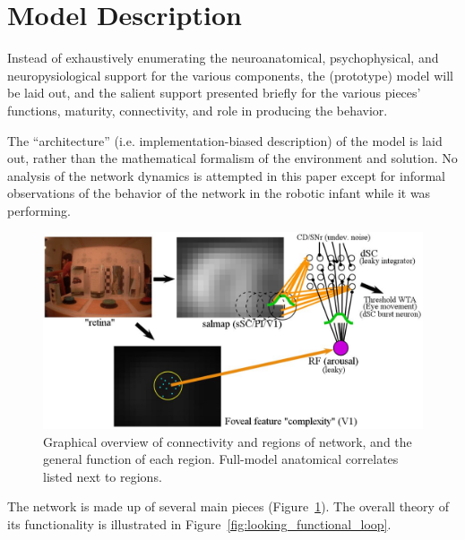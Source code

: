 \documentclass[conference]{IEEEtran}
\begin{document}
\section{Model Description}
Instead of exhaustively enumerating the neuroanatomical,
psychophysical, and neuropysiological support for the various
components, the (prototype) model will be laid out, and the salient
support presented briefly for the various pieces' functions, maturity,
connectivity, and role in producing the behavior.

The ``architecture'' (i.e. implementation-biased description) of the
model is laid out, rather than the mathematical formalism of the
environment and solution. No analysis of the network dynamics is
attempted in this paper except for informal observations of the
behavior of the network in the robotic infant while it was performing.

\begin{figure} [!t]
\centering
\includegraphics[width=15.0cm]{looking_prototype_model.jpg}
\caption{Graphical overview of connectivity and regions of network,
  and the general function of each region. Full-model anatomical
  correlates listed next to regions.}
\label{fig:looking_prototype_model}
\end{figure}

The network is made up of several main pieces
(Figure~\ref{fig:looking_prototype_model}). The overall theory of its
functionality is illustrated in
Figure~\ref{fig:looking_functional_loop}.
\end{document}
